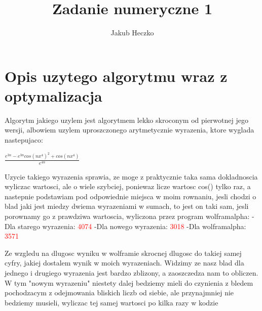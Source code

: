 \documentclass[a4paper,8pt]{article}
\begin{document}
\title{{\Large}Zadanie numeryczne 1}
\date{}
\author{Jakub Heczko}

\maketitle


\section{Opis uzytego algorytmu wraz z optymalizacja}


Algorytm jakiego uzylem jest algorytmem lekko skroconym od pierwotnej jego wersji, albowiem uzylem uproszczonego arytmetycznie wyrazenia, ktore wyglada nastepujaco:

\begin{center}
    $\frac{e^{3n}-e^{3n}cos(nx^4)^2+cos(nx^4)}{e^{4n}}$
\end{center}

Uzycie takiego wyrazenia sprawia, ze moge z praktycznie taka sama dokladnoscia wyliczac wartosci, ale o wiele szybciej, poniewaz licze wartosc cos() tylko raz, a nastepnie podstawiam pod odpowiednie miejsca w moim rownaniu, jesli chodzi o blad jaki jest miedzy dwiema wyrazeniami w sumach, to jest on taki sam, jesli porownamy go z prawdziwa wartoscia, wyliczona przez program wolframalpha:
\newline
\newline
\quad -Dla starego wyrazenia:
\newline
{}\textcolor{red}{4074}
\newline
\newline
\quad -Dla nowego wyrazenia:
\newline
{}\textcolor{red}{3018}
\newline
\newline
\quad -Dla wolframalpha:
\newline
{}\textcolor{red}{3571}
\newline

Ze wzgledu na dlugosc wyniku w wolframie skrocnej dlugosc do takiej samej cyfry, jakiej dostalem wynik w moich wyrazeniach. Widzimy ze nasz blad dla jednego i drugiego wyrazenia jest bardzo zblizony, a zaoszczedza nam to obliczen. W tym "nowym wyrazeniu" niestety dalej bedziemy mieli do czynienia z bledem pochodzacym z odejmowania bliskich liczb od siebie, ale przynajmniej nie bedziemy musieli, wyliczac tej samej wartosci po kilka razy w kodzie
\end{document}
